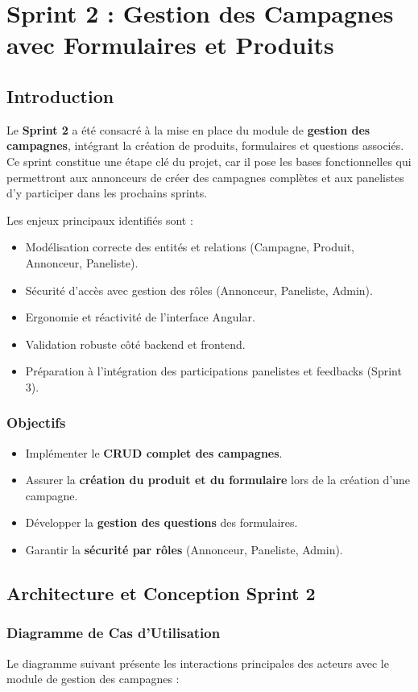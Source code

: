 \chapter{Sprint 2 : Gestion des Campagnes avec Formulaires et Produits}
\newpage
\section{Introduction}
Le \textbf{Sprint 2} a été consacré à la mise en place du module de \textbf{gestion des campagnes}, intégrant la création de produits, formulaires et questions associés.
Ce sprint constitue une étape clé du projet, car il pose les bases fonctionnelles qui permettront aux annonceurs de créer des campagnes complètes et aux panelistes d’y participer dans les prochains sprints.

Les enjeux principaux identifiés sont :
\begin{itemize}[label=\textbullet]
    \item Modélisation correcte des entités et relations (Campagne, Produit, Annonceur, Paneliste).
    \item Sécurité d'accès avec gestion des rôles (Annonceur, Paneliste, Admin).
    \item Ergonomie et réactivité de l’interface Angular.
    \item Validation robuste côté backend et frontend.
    \item Préparation à l’intégration des participations panelistes et feedbacks (Sprint 3).
\end{itemize}
\subsection{Objectifs}
\begin{itemize}[label=\textbullet]
    \item Implémenter le \textbf{CRUD complet des campagnes}.
    \item Assurer la \textbf{création du produit et du formulaire} lors de la création d’une campagne.
    \item Développer la \textbf{gestion des questions} des formulaires.
    \item Garantir la \textbf{sécurité par rôles} (Annonceur, Paneliste, Admin).
\end{itemize}
\section{Architecture et Conception Sprint 2}
\subsection{Diagramme de Cas d’Utilisation}
Le diagramme suivant présente les interactions principales des acteurs avec le module de gestion des campagnes :

